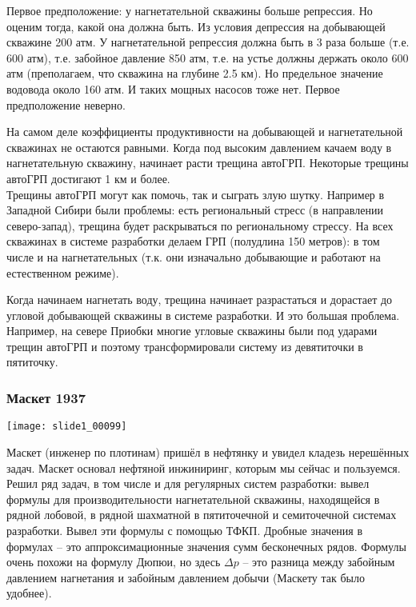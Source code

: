 \documentclass[main.tex]{subfiles}
\begin{document}
Первое предположение: у нагнетательной скважины больше репрессия. Но оценим тогда, какой она должна быть. Из условия депрессия на добывающей скважине 200 атм. У нагнетательной репрессия должна быть в 3 раза больше (т.е. 600 атм), т.е. забойное давление 850 атм, т.е. на устье должны держать около 600 атм (преполагаем, что скважина на глубине 2.5 км).
Но предельное значение водовода около 160 атм. И таких мощных насосов тоже нет. Первое предположение неверно.

На самом деле коэффициенты продуктивности на добывающей и нагнетательной скважинах не остаются равными. Когда под высоким давлением качаем воду в нагнетательную скважину, начинает расти трещина автоГРП. Некоторые трещины автоГРП достигают 1 км и более.\\

Трещины автоГРП могут как помочь, так и сыграть злую шутку.
Например в Западной Сибири были проблемы: есть региональный стресс (в направлении северо-запад), трещина будет раскрываться по региональному стрессу. На всех скважинах в системе разработки делаем ГРП (полудлина 150 метров): в том числе и на нагнетательных (т.к. они изначально добывающие и работают на естественном режиме).

Когда начинаем нагнетать воду, трещина начинает разрастаться и дорастает до угловой добывающей скважины в системе разработки. И это большая проблема. Например, на севере Приобки многие угловые скважины были под ударами трещин автоГРП и поэтому трансформировали систему из девятиточки в пятиточку.

\subsubsection{Маскет 1937}

\texttt{[image: slide1\_00099]}

Маскет (инженер по плотинам) пришёл в нефтянку и увидел кладезь нерешённых задач. Маскет основал нефтяной инжиниринг, которым мы сейчас и пользуемся.\\

Решил ряд задач, в том числе и для регулярных систем разработки: вывел формулы для производительности нагнетательной скважины, находящейся в рядной лобовой, в рядной шахматной в пятиточечной и семиточечной системах разработки. Вывел эти формулы с помощью ТФКП. Дробные значения в формулах -- это аппроксимационные значения сумм бесконечных рядов. Формулы очень похожи на формулу Дюпюи, но здесь $\Delta p$ -- это разница между забойным давлением нагнетания и забойным давлением добычи (Маскету так было удобнее).
\end{document}
